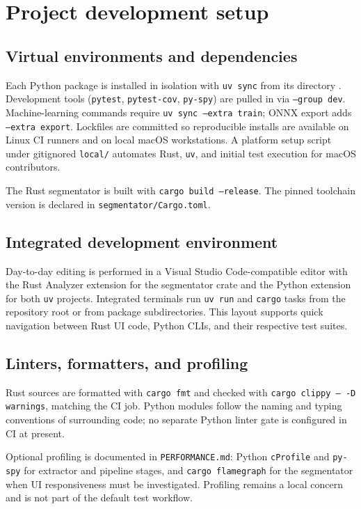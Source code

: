 \section{Project development setup}
\label{sec:devsetup}

\subsection{Virtual environments and dependencies}

Each Python package is installed in isolation with \texttt{uv sync} from its directory \cite{AstralUV}. Development tools (\texttt{pytest}, \texttt{pytest-cov}, \texttt{py-spy}) are pulled in via \texttt{--group dev}. Machine-learning commands require \texttt{uv sync --extra train}; ONNX export adds \texttt{--extra export}. Lockfiles are committed so reproducible installs are available on Linux CI runners and on local macOS workstations. A platform setup script under gitignored \texttt{local/} automates Rust, \texttt{uv}, and initial test execution for macOS contributors.

The Rust segmentator is built with \texttt{cargo build --release}. The pinned toolchain version is declared in \texttt{segmentator/Cargo.toml}.

\subsection{Integrated development environment}

Day-to-day editing is performed in a Visual Studio Code-compatible editor with the Rust Analyzer extension for the segmentator crate and the Python extension for both \texttt{uv} projects. Integrated terminals run \texttt{uv run} and \texttt{cargo} tasks from the repository root or from package subdirectories. This layout supports quick navigation between Rust UI code, Python CLIs, and their respective test suites.

\subsection{Linters, formatters, and profiling}

Rust sources are formatted with \texttt{cargo fmt} and checked with \texttt{cargo clippy -- -D warnings}, matching the CI job. Python modules follow the naming and typing conventions of surrounding code; no separate Python linter gate is configured in CI at present.

Optional profiling is documented in \texttt{PERFORMANCE.md}: Python \texttt{cProfile} and \texttt{py-spy} for extractor and pipeline stages, and \texttt{cargo flamegraph} for the segmentator when UI responsiveness must be investigated. Profiling remains a local concern and is not part of the default test workflow.
